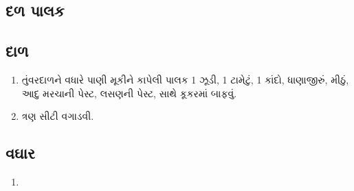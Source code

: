 \documentclass[../recipes.tex]{subfiles}
\begin{document}
\begin{gujarati}

\chapter{દળ પાલક }

\section*{દાળ}

\begin{enumerate}
    \item તુંવરદાળને વધારે પાણી મૂકીને કાપેલી પાલક 1 ઝૂડી, 1 ટામેટું, 1 કાંદો, ધાણાજીરું, મીઠું, આદુ મરચાની પેસ્ટ, લસણની પેસ્ટ, સાથે કૂકરમાં બાફવું.
    \item ત્રણ સીટી વગાડવી.
\end{enumerate}

\section*{વઘાર}

\begin{enumerate}
    \item 
\end{enumerate}

\end{gujarati}
\end{document}
